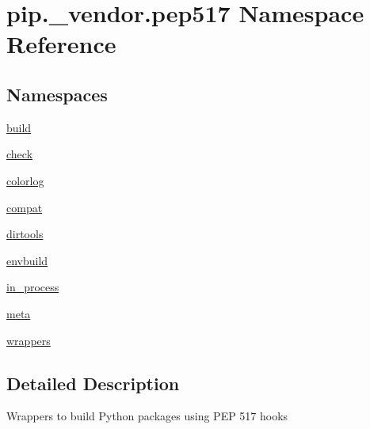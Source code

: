 \hypertarget{namespacepip_1_1__vendor_1_1pep517}{}\section{pip.\+\_\+vendor.\+pep517 Namespace Reference}
\label{namespacepip_1_1__vendor_1_1pep517}
\subsection*{Namespaces}
\begin{DoxyCompactItemize}
\item 
 \hyperlink{namespacepip_1_1__vendor_1_1pep517_1_1build}{build}
\item 
 \hyperlink{namespacepip_1_1__vendor_1_1pep517_1_1check}{check}
\item 
 \hyperlink{namespacepip_1_1__vendor_1_1pep517_1_1colorlog}{colorlog}
\item 
 \hyperlink{namespacepip_1_1__vendor_1_1pep517_1_1compat}{compat}
\item 
 \hyperlink{namespacepip_1_1__vendor_1_1pep517_1_1dirtools}{dirtools}
\item 
 \hyperlink{namespacepip_1_1__vendor_1_1pep517_1_1envbuild}{envbuild}
\item 
 \hyperlink{namespacepip_1_1__vendor_1_1pep517_1_1in__process}{in\+\_\+process}
\item 
 \hyperlink{namespacepip_1_1__vendor_1_1pep517_1_1meta}{meta}
\item 
 \hyperlink{namespacepip_1_1__vendor_1_1pep517_1_1wrappers}{wrappers}
\end{DoxyCompactItemize}


\subsection{Detailed Description}
\begin{DoxyVerb}Wrappers to build Python packages using PEP 517 hooks
\end{DoxyVerb}
 